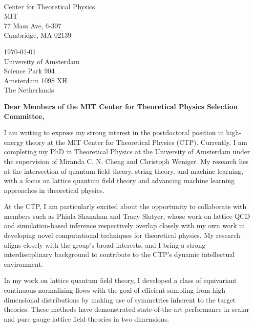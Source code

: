 \documentclass[11pt]{article}
\title{}
\author{}
\date{}
\begin{document}
\thispagestyle{firstpagestyle}

\noindent
\begin{minipage}[t]{0.5\textwidth}
\phantom{
\today \\
}
\vspace{0.2cm} \\
Center for Theoretical Physics \\
MIT \\
77 Mass Ave, 6-307 \\
Cambridge, MA 02139

\end{minipage}
\begin{minipage}[t]{0.5\textwidth}
\flushright
\today \\
\vspace{0.2cm}
University of Amsterdam \\
Science Park 904 \\
Amsterdam 1098 XH \\
The Netherlands \\
\end{minipage}

\vspace{20pt}

\noindent
\textbf{Dear Members of the MIT Center for Theoretical Physics Selection Committee,}

I am writing to express my strong interest in the postdoctoral position in high-energy theory at the MIT Center for Theoretical Physics (CTP). Currently, I am completing my PhD in Theoretical Physics at the University of Amsterdam under the supervision of Miranda C. N. Cheng and Christoph Weniger. My research lies at the intersection of quantum field theory, string theory, and machine learning, with a focus on lattice quantum field theory and advancing machine learning approaches in theoretical physics.

At the CTP, I am particularly excited about the opportunity to collaborate with members such as Phiala Shanahan and Tracy Slatyer, whose work on lattice QCD and simulation-based inference respectively overlap closely with my own work in developing novel computational techniques for theoretical physics. My research aligns closely with the group's broad interests, and I bring a strong interdisciplinary background to contribute to the CTP's dynamic intellectual environment.

In my work on lattice quantum field theory, I developed a class of equivariant continuous normalizing flows with the goal of efficient sampling from high-dimensional distributions by making use of symmetries inherent to the target theories. These methods have demonstrated state-of-the-art performance in scalar and pure gauge lattice field theories in two dimensions.
\end{document}
